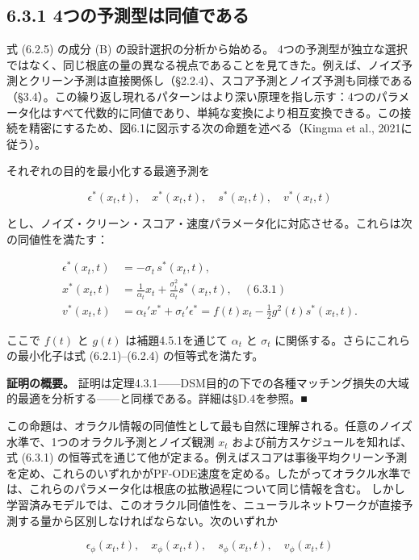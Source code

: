 \subsection*{6.3.1 4つの予測型は同値である}


式 (6.2.5) の成分 (B) の設計選択の分析から始める。
4つの予測型が独立な選択ではなく、同じ根底の量の異なる視点であることを見てきた。例えば、ノイズ予測とクリーン予測は直接関係し（§2.2.4）、スコア予測とノイズ予測も同様である（§3.4）。この繰り返し現れるパターンはより深い原理を指し示す：4つのパラメータ化はすべて代数的に同値であり、単純な変換により相互変換できる。この接続を精密にするため、図6.1に図示する次の命題を述べる（Kingma et al., 2021に従う）。

\begin{propositionbox}[命題 6.3.1（パラメータ化の同値性）]
それぞれの目的を最小化する最適予測を

\[
\epsilon^*(x_t,t),\quad x^*(x_t,t),\quad s^*(x_t,t),\quad v^*(x_t,t)
\]

とし、ノイズ・クリーン・スコア・速度パラメータ化に対応させる。これらは次の同値性を満たす：

\[
\begin{aligned}
\epsilon^*(x_t,t)&=-\sigma_t\,s^*(x_t,t), \\
x^*(x_t,t)&=\frac{1}{\alpha_t}x_t+\frac{\sigma_t^2}{\alpha_t}s^*(x_t,t), \quad (6.3.1) \\
v^*(x_t,t)&=\alpha_t'x^*+\sigma_t'\epsilon^*=f(t)x_t-\frac{1}{2}g^2(t)s^*(x_t,t).
\end{aligned}
\]

ここで $f(t)$ と $g(t)$ は補題4.5.1を通じて $\alpha_t$ と $\sigma_t$ に関係する。さらにこれらの最小化子は式 (6.2.1)–(6.2.4) の恒等式を満たす。
\end{propositionbox}


\textbf{証明の概要。} 証明は定理4.3.1——DSM目的の下での各種マッチング損失の大域的最適を分析する——と同様である。詳細は§D.4を参照。■

この命題は、オラクル情報の同値性として最も自然に理解される。任意のノイズ水準で、1つのオラクル予測とノイズ観測 $x_t$ および前方スケジュールを知れば、式 (6.3.1) の恒等式を通じて他が定まる。例えばスコアは事後平均クリーン予測を定め、これらのいずれかがPF-ODE速度を定める。したがってオラクル水準では、これらのパラメータ化は根底の拡散過程について同じ情報を含む。
しかし学習済みモデルでは、このオラクル同値性を、ニューラルネットワークが直接予測する量から区別しなければならない。次のいずれか

\[
\epsilon_\phi(x_t,t),\quad x_\phi(x_t,t),\quad s_\phi(x_t,t),\quad v_\phi(x_t,t)
\]


